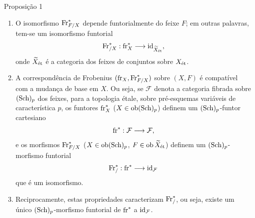 \begin{statement}{Proposição 1}
\begin{enumerate}[label=\alph*)]
\item O isomorfismo $\operatorname{Fr}^*_{F/X}$ depende funtorialmente do feixe $F$; em outras palavras, tem-se um isomorfismo funtorial
\[
\operatorname{Fr}^*_{/X}:\operatorname{fr}_X^*\longrightarrow \operatorname{id}_{\widetilde X_{\mathrm{\acute{e}t}}},
\]
onde $\widetilde X_{\mathrm{\acute{e}t}}$ é a categoria dos feixes de conjuntos sobre $X_{\mathrm{\acute{e}t}}$.
\item A correspondência de Frobenius $(\operatorname{fr}_X,\operatorname{Fr}^*_{F/X})$ sobre $(X,F)$ é compatível com a mudança de base em $X$. Ou seja, se $\mathcal F$ denota a categoria fibrada sobre $(\operatorname{Sch})_p$ dos feixes, para a topologia étale, sobre pré-esquemas variáveis de característica $p$, os funtores $\operatorname{fr}_X^*$ ($X\in\operatorname{ob}(\operatorname{Sch})_p$) definem um $(\operatorname{Sch})_p$-funtor cartesiano
\[
\operatorname{fr}^*: \mathcal F\longrightarrow\mathcal F,
\]
e os morfismos $\operatorname{Fr}^*_{F/X}$ ($X\in\operatorname{ob}(\operatorname{Sch})_p$, $F\in\operatorname{ob}\widetilde X_{\mathrm{\acute{e}t}}$) definem um $(\operatorname{Sch})_p$-morfismo funtorial
\[
\operatorname{Fr}^*_{/}:\operatorname{fr}^*\longrightarrow\operatorname{id}_{\mathcal F}
\]
que é um isomorfismo.
\item Reciprocamente, estas propriedades caracterizam $\operatorname{Fr}^*_{/}$, ou seja, existe um único $(\operatorname{Sch})_p$-morfismo funtorial de $\operatorname{fr}^*$ a $\operatorname{id}_{\mathcal F}$.
\end{enumerate}
\end{statement}
